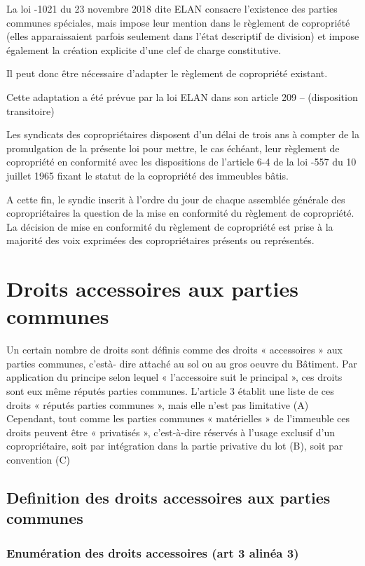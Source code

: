 		La loi -1021 du 23 novembre 2018 dite ELAN consacre l’existence des parties communes spéciales,
		mais impose leur mention dans le règlement de copropriété (elles apparaissaient parfois seulement dans
		l’état descriptif de division) et impose également la création explicite d’une clef de charge constitutive.
		
		Il peut donc être nécessaire d’adapter le règlement de copropriété existant.
		
		Cette adaptation a été prévue par la loi ELAN dans son article 209 – \II (disposition transitoire)
		
		Les syndicats des copropriétaires disposent d’un délai de trois ans à compter de la promulgation de la
		présente loi pour mettre, le cas échéant, leur règlement de copropriété en conformité avec les dispositions
		de l’article 6-4 de la loi -557 du 10 juillet 1965 fixant le statut de la copropriété des immeubles bâtis.
		
		A cette fin, le syndic inscrit à l’ordre du jour de chaque assemblée générale des copropriétaires la question
		de la mise en conformité du règlement de copropriété. La décision de mise en conformité du règlement
		de copropriété est prise à la majorité des voix exprimées des copropriétaires présents ou représentés.

\section{Droits accessoires aux parties communes}

	Un certain nombre de droits sont définis comme des droits « accessoires » aux parties communes, c’està-
	dire attaché au sol ou au gros oeuvre du Bâtiment. Par application du principe selon lequel « l’accessoire
	suit le principal », ces droits sont eux même réputés parties communes. L’article 3 établit une liste de ces
	droits « réputés parties communes », mais elle n’est pas limitative (A) Cependant, tout comme les parties
	communes « matérielles » de l’immeuble ces droits peuvent être « privatisés », c’est-à-dire réservés à
	l’usage exclusif d’un copropriétaire, soit par intégration dans la partie privative du lot (B), soit par
	convention (C)
	
	\subsection{Definition des droits accessoires aux parties communes}
	
		\subsubsection{Enumération des droits accessoires (art 3 alinéa 3)}
		
